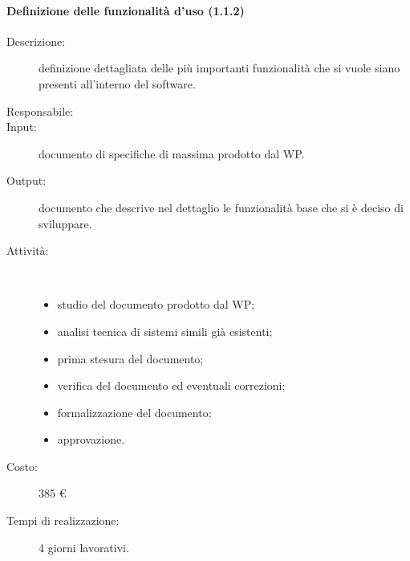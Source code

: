 \begin{description}
\paragraph{Definizione delle funzionalit\`{a} d'uso (1.1.2)}
\begin{description}
\item[Descrizione:] definizione dettagliata delle pi\`{u} importanti funzionalit\`{a} che si vuole siano presenti all'interno del software.
\item[Responsabile:]
\item[Input:] documento di specifiche di massima prodotto dal WP.
\item[Output:] documento che descrive nel dettaglio le funzionalità base che si è deciso di sviluppare.
\item[Attività:]\mbox{}\\[-1.5\baselineskip]
	\begin{itemize}
	\item studio del documento prodotto dal WP;
	\item analisi tecnica di sistemi simili gi\`{a} esistenti;
	\item prima stesura del documento;
	\item verifica del documento ed eventuali correzioni;
	\item formalizzazione del documento;
	\item approvazione.
	\end{itemize}
\item[Costo:] 385 \euro{}
\item[Tempi di realizzazione:] 4 giorni lavorativi.
\end{description}


\end{description}
